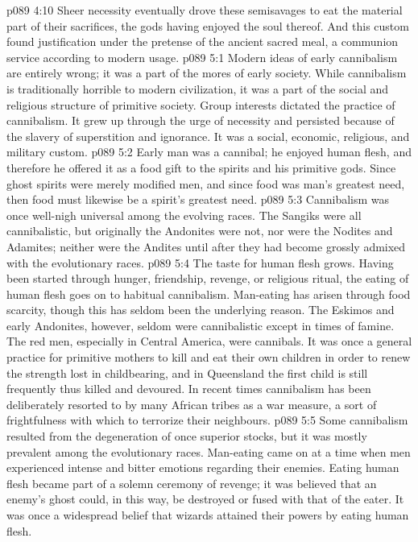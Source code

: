 \vs p089 4:10 Sheer necessity eventually drove these semisavages to eat the material part of their sacrifices, the gods having enjoyed the soul thereof. And this custom found justification under the pretense of the ancient sacred meal, a communion service according to modern usage.
\vs p089 5:1 Modern ideas of early cannibalism are entirely wrong; it was a part of the mores of early society. While cannibalism is traditionally horrible to modern civilization, it was a part of the social and religious structure of primitive society. Group interests dictated the practice of cannibalism. It grew up through the urge of necessity and persisted because of the slavery of superstition and ignorance. It was a social, economic, religious, and military custom.
\vs p089 5:2 Early man was a cannibal; he enjoyed human flesh, and therefore he offered it as a food gift to the spirits and his primitive gods. Since ghost spirits were merely modified men, and since food was man’s greatest need, then food must likewise be a spirit’s greatest need.
\vs p089 5:3 Cannibalism was once well\hyp{}nigh universal among the evolving races. The Sangiks were all cannibalistic, but originally the Andonites were not, nor were the Nodites and Adamites; neither were the Andites until after they had become grossly admixed with the evolutionary races.
\vs p089 5:4 The taste for human flesh grows. Having been started through hunger, friendship, revenge, or religious ritual, the eating of human flesh goes on to habitual cannibalism. Man\hyp{}eating has arisen through food scarcity, though this has seldom been the underlying reason. The Eskimos and early Andonites, however, seldom were cannibalistic except in times of famine. The red men, especially in Central America, were cannibals. It was once a general practice for primitive mothers to kill and eat their own children in order to renew the strength lost in childbearing, and in Queensland the first child is still frequently thus killed and devoured. In recent times cannibalism has been deliberately resorted to by many African tribes as a war measure, a sort of frightfulness with which to terrorize their neighbours.
\vs p089 5:5 Some cannibalism resulted from the degeneration of once superior stocks, but it was mostly prevalent among the evolutionary races. Man\hyp{}eating came on at a time when men experienced intense and bitter emotions regarding their enemies. Eating human flesh became part of a solemn ceremony of revenge; it was believed that an enemy’s ghost could, in this way, be destroyed or fused with that of the eater. It was once a widespread belief that wizards attained their powers by eating human flesh.

